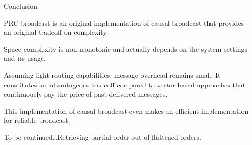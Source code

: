 \documentclass[10pt, xcolor={usenames, dvipsnames}]{beamer}
\begin{document}
\begin{frame}{Conclusion}

  PRC-broadcast is an original implementation of causal broadcast that provides
  an original tradeoff on complexity.
  
  \vspace{2em}

  Space complexity is non-monotonic and actually depends on the system
  settings and its usage.

  \vspace{1em}

  Assuming light routing capabilities, message overhead remains small. It
  constitutes an advantageous tradeoff compared to vector-based approaches that
  continuously pay the price of past delivered messages.

  \vspace{1em}

  This implementation of causal broadcast even makes an efficient implementation
  for reliable broadcast.

\end{frame}

\begin{frame}[standout]
  To be continued\ldots Retrieving partial order out of flattened orders.
\end{frame}
\end{document}
